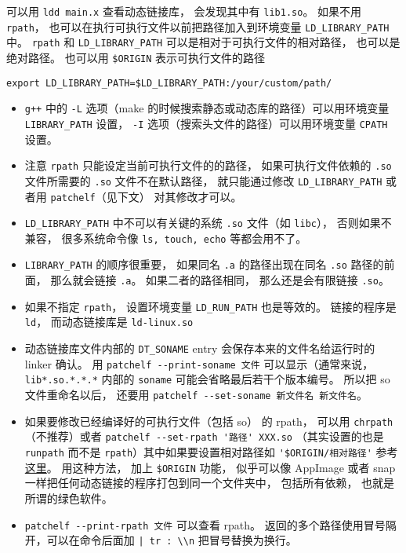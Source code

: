 可以用 \verb`ldd main.x` 查看动态链接库， 会发现其中有 \verb`lib1.so`。 如果不用 \verb`rpath`， 也可以在执行可执行文件以前把路径加入到环境变量 \verb`LD_LIBRARY_PATH` 中。 \verb`rpath` 和 \verb`LD_LIBRARY_PATH` 可以是相对于可执行文件的相对路径， 也可以是绝对路径。 也可以用 \verb`$ORIGIN` 表示可执行文件的路径
\begin{lstlisting}[language=none]
export LD_LIBRARY_PATH=$LD_LIBRARY_PATH:/your/custom/path/
\end{lstlisting}
\begin{itemize}
\item \verb`g++` 中的 \verb`-L` 选项（make 的时候搜索静态或动态库的路径）可以用环境变量 \verb`LIBRARY_PATH` 设置， \verb`-I` 选项（搜索头文件的路径）可以用环境变量 \verb`CPATH` 设置。
\item 注意 \verb`rpath` 只能设定当前可执行文件的的路径， 如果可执行文件依赖的 \verb`.so` 文件所需要的 \verb`.so` 文件不在默认路径， 就只能通过修改 \verb`LD_LIBRARY_PATH` 或者用 \verb`patchelf`（见下文） 对其修改才可以。
\item \verb`LD_LIBRARY_PATH` 中不可以有关键的系统 \verb`.so` 文件（如 \verb`libc`）， 否则如果不兼容， 很多系统命令像 \verb`ls, touch, echo` 等都会用不了。
\item \verb`LIBRARY_PATH` 的顺序很重要， 如果同名 \verb`.a` 的路径出现在同名 \verb`.so` 路径的前面， 那么就会链接 \verb`.a`。 如果二者的路径相同， 那么还是会有限链接 \verb`.so`。
\item 如果不指定 \verb`rpath`， 设置环境变量 \verb`LD_RUN_PATH` 也是等效的。 链接的程序是 \verb`ld`， 而动态链接库是 \verb`ld-linux.so`
\item 动态链接库文件内部的 \verb`DT_SONAME` entry 会保存本来的文件名给运行时的 linker 确认。 用 \verb`patchelf --print-soname 文件` 可以显示（通常来说， \verb`lib*.so.*.*.*` 内部的 \verb`soname` 可能会省略最后若干个版本编号。 所以把 so 文件重命名以后， 还要用 \verb`patchelf --set-soname 新文件名 新文件名`。
\item 如果要修改已经编译好的可执行文件（包括 so） 的 rpath， 可以用 \verb`chrpath` （不推荐）或者 \verb`patchelf --set-rpath '路径' XXX.so` （其实设置的也是 \verb`runpath` 而不是 \verb`rpath`）其中如果要设置相对路径如 \verb`'$ORIGIN/相对路径'` 参考\href{https://stackoverflow.com/questions/13769141/can-i-change-rpath-in-an-already-compiled-binary}{这里}。 用这种方法， 加上 \verb`$ORIGIN` 功能， 似乎可以像 AppImage 或者 snap 一样把任何动态链接的程序打包到同一个文件夹中， 包括所有依赖， 也就是所谓的绿色软件。
\item \verb`patchelf --print-rpath 文件` 可以查看 rpath。 返回的多个路径使用冒号隔开，可以在命令后面加 \verb`| tr : \\n` 把冒号替换为换行。

\end{itemize}
